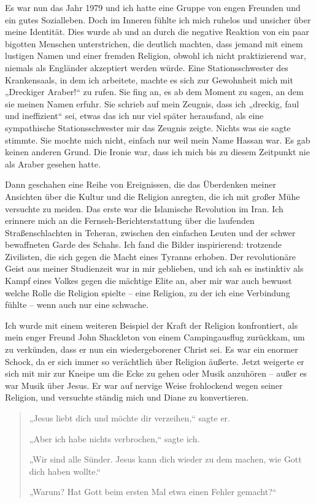\documentclass[12pt]{memoir}
\begin{document}
Es war nun das Jahr 1979 und ich hatte eine Gruppe
von engen Freunden und ein gutes Sozialleben.
Doch im Inneren fühlte ich mich ruhelos und unsicher über meine Identität.
Dies wurde ab und an durch die negative Reaktion
von ein paar bigotten Menschen unterstrichen,
die deutlich machten, dass jemand mit einem lustigen Namen
und einer fremden Religion, obwohl ich nicht praktizierend war,
niemals als Engländer akzeptiert werden würde.
Eine Stationsschwester des Krankensaals, in dem ich arbeitete,
machte es sich zur Gewohnheit mich mit „Dreckiger Araber!“ zu rufen.
Sie fing an, es ab dem Moment zu sagen, an dem sie meinen Namen erfuhr.
Sie schrieb auf mein Zeugnis, dass ich „dreckig, faul und ineffizient“ sei,
etwas das ich nur viel später herausfand,
als eine sympathische Stationsschwester mir das Zeugnis zeigte.
Nichts was sie sagte stimmte.
Sie mochte mich nicht, einfach nur weil mein Name Hassan war.
Es gab keinen anderen Grund.
Die Ironie war, dass ich mich bis zu diesem Zeitpunkt
nie als Araber gesehen hatte.

Dann geschahen eine Reihe von Ereignissen,
die das Überdenken meiner Ansichten über die Kultur und die Religion anregten,
die ich mit großer Mühe versuchte zu meiden.
Das erste war die Islamische Revolution im Iran.
Ich erinnere mich an die Fernseh-Berichterstattung
über die laufenden Straßenschlachten in Teheran,
zwischen den einfachen Leuten und der schwer bewaffneten Garde des Schahs.
Ich fand die Bilder inspirierend:
trotzende Zivilisten, die sich gegen die Macht eines Tyranns erhoben.
Der revolutionäre Geist aus meiner Studienzeit war in mir geblieben,
und ich sah es instinktiv als Kampf eines Volkes gegen die mächtige Elite an,
aber mir war auch bewusst welche Rolle die Religion spielte – eine Religion,
zu der ich eine Verbindung fühlte – wenn auch nur eine schwache.

Ich wurde mit einem weiteren Beispiel der Kraft der Religion konfrontiert,
als mein enger Freund John Shackleton von einem Campingausflug zurückkam,
um zu verkünden, dass er nun ein wiedergeborener Christ sei.
Es war ein enormer Schock,
da er sich immer so verächtlich über Religion äußerte.
Jetzt weigerte er sich mit mir zur Kneipe um die Ecke zu gehen
oder Musik anzuhören – außer es war Musik über Jesus.
Er war auf nervige Weise frohlockend wegen seiner Religion,
und versuchte ständig mich und Diane zu konvertieren.

\begin{quote}
„Jesus liebt dich und möchte dir verzeihen,“ sagte er.

„Aber ich habe nichts verbrochen,“ sagte ich.

„Wir sind alle Sünder.
Jesus kann dich wieder zu dem machen, wie Gott dich haben wollte.“

„Warum? Hat Gott beim ersten Mal etwa einen Fehler gemacht?“
\end{quote}
\end{document}
